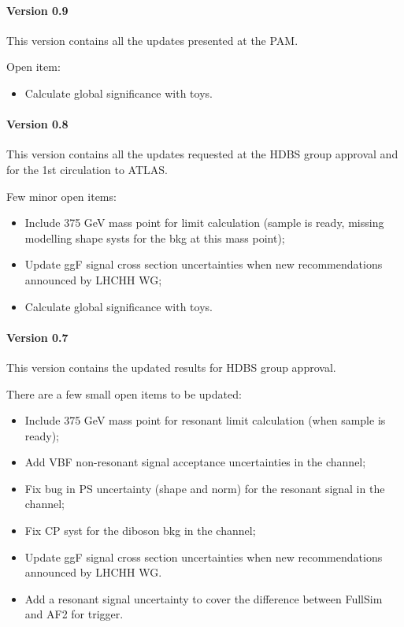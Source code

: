 \paragraph*{Version 0.9}

This version contains all the updates presented at the PAM.

Open item:

\begin{itemize}
\item Calculate global significance with toys.
\end{itemize}

\paragraph*{Version 0.8}

This version contains all the updates requested at the HDBS group approval and for the 1st circulation to ATLAS.

Few minor open items:

\begin{itemize}
\item Include 375 GeV mass point for limit calculation (sample is ready, missing modelling shape systs for the bkg at this mass point);
\item Update ggF signal cross section uncertainties when new recommendations announced by LHCHH WG;
\item Calculate global significance with toys.
\end{itemize}

\paragraph*{Version 0.7}

This version contains the updated results for HDBS group approval.

There are a few small open items to be updated:

\begin{itemize}
\item Include 375 GeV mass point for resonant limit calculation (when sample is ready);
\item Add VBF non-resonant signal acceptance uncertainties in the \lephad channel;
\item Fix bug in PS uncertainty (shape and norm) for the resonant signal in the \lephad channel;
\item Fix CP syst for the diboson bkg in the \lephad channel;
\item Update ggF signal cross section uncertainties when new recommendations announced by LHCHH WG.
\item Add a resonant signal uncertainty to cover the difference between FullSim and AF2 for \tauhad trigger.
\end{itemize}

